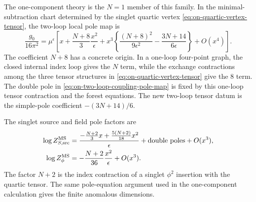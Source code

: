 The one-component theory is the \(N=1\) member of this family.  In the
minimal-subtraction chart determined by the singlet quartic vertex
\eqref{eq:on-quartic-vertex-tensor}, the two-loop local pole map is
\begin{equation}
  \frac{g_0}{16\pi^2}
  =
  \mu^\epsilon
  \left[
    x
    +\frac{N+8}{3}\frac{x^2}{\epsilon}
    +x^3\left\{
      \frac{(N+8)^2}{9\epsilon^2}
      -\frac{3N+14}{6\epsilon}
    \right\}
    +O(x^4)
  \right].
  \label{eq:on-two-loop-coupling-pole-map}
\end{equation}
The coefficient \(N+8\) has a concrete origin.  In a one-loop four-point
graph, the closed internal index loop gives the \(N\) term, while the exchange
contractions among the three tensor structures in
\eqref{eq:on-quartic-vertex-tensor} give the \(8\) term.  The double pole in
\eqref{eq:on-two-loop-coupling-pole-map} is fixed by this one-loop tensor
contraction and the forest equations.  The new two-loop tensor datum is the
simple-pole coefficient \(-(3N+14)/6\).

The singlet source and field pole factors are
\begin{align}
  \log Z_{S,\rm src}^{\rm MS}
  &=
  \frac{
    -\frac{N+2}{3}x+\frac{5(N+2)}{18}x^2
  }{\epsilon}
  +\hbox{double poles}
  +O(x^3),
  \label{eq:on-source-pole}
  \\
  \log Z_\phi^{\rm MS}
  &=
  -\frac{N+2}{36}\frac{x^2}{\epsilon}
  +O(x^3).
  \label{eq:on-field-pole}
\end{align}
The factor \(N+2\) is the index contraction of a singlet \(\phi^2\) insertion
with the quartic tensor.  The same pole-equation argument used in the
one-component calculation gives the finite anomalous dimensions.

